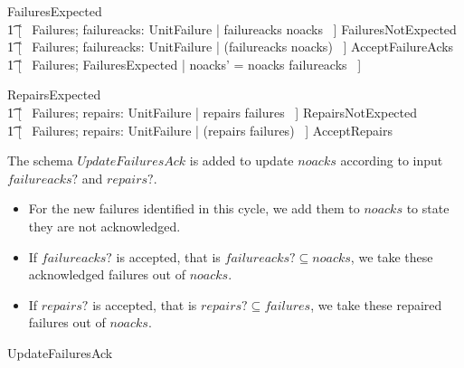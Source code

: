 \documentclass{report} %
\begin{document}
\begin{zed}
  FailuresExpected 
  \\ %
  \t1 [~ Failures; failureacks: \power UnitFailure | failureacks \subseteq noacks ~]
  \also %
  FailuresNotExpected 
  \\ %
  \t1 [~ Failures; failureacks: \power UnitFailure | \lnot (failureacks \subseteq noacks) ~]
  \also %
  AcceptFailureAcks 
  \\ %
  \t1 [~ \Delta Failures; FailuresExpected | noacks' = noacks \setminus failureacks ~]
\end{zed}

\begin{zed}
  RepairsExpected 
  \\ %
  \t1 [~ Failures; repairs: \power UnitFailure | repairs \subseteq failures ~]
  \also RepairsNotExpected 
  \\ %
  \t1 [~ Failures; repairs: \power UnitFailure | \lnot (repairs \subseteq failures) ~]
  \also %
  AcceptRepairs 
\end{zed}

The schema $UpdateFailuresAck$ is added to update $noacks$ according to input $failureacks?$ and $repairs?$.
\begin{itemize}
    \item For the new failures identified in this cycle, we add them to $noacks$ to state they are not acknowledged.
    \item If $failureacks?$ is accepted, that is $failureacks? \subseteq noacks$, we take these acknowledged failures  out of $noacks$.
    \item If $repairs?$ is accepted, that is $repairs? \subseteq failures$, we take these repaired failures  out of $noacks$.
\end{itemize}

\begin{zed}
UpdateFailuresAck 
\end{zed}
\end{document}
